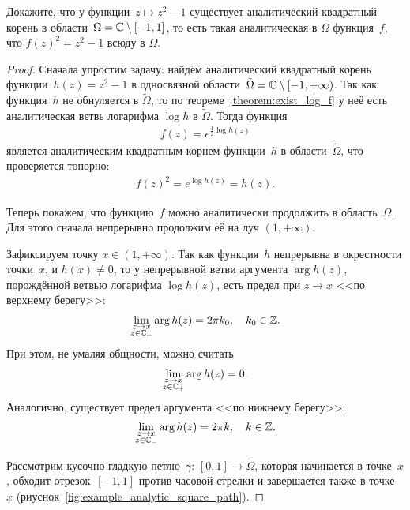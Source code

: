 \documentclass[../complex-analysis.tex]{subfiles}
\begin{document}
\begin{exmpl}
 Докажите, что у функции~$ z \mapsto z^{2}-1 $ существует аналитический квадратный корень в области~$ \Omega = \mathbb{C} \setminus [-1,1] $, то есть такая аналитическая в $ \Omega $ функция~$ f $, что $ f(z)^{2} = z^{2} - 1 $ всюду в $ \Omega $.
\end{exmpl}
\begin{proof}
 Сначала упростим задачу: найдём аналитический квадратный корень функции~$ h(z) = z^{2}-1 $ в односвязной области~$ \tilde\Omega = \mathbb{C} \setminus [-1, +\infty) $. Так как функция~$ h $ не обнуляется в $ \tilde\Omega $, то по теореме~\ref{theorem:exist_log_f} у неё есть аналитическая ветвь логарифма $ \log h $ в $ \tilde\Omega $. Тогда функция
 \begin{align*}
  f(z) = e^{\frac{1}{2}\log h(z)}
 \end{align*} является аналитическим квадратным корнем функции~$h$ в области~$ \tilde\Omega $, что проверяется топорно:
 \begin{align*}
  f(z)^{2} = e^{\log h(z)} = h(z).
 \end{align*}

 Теперь покажем, что функцию~$ f $ можно аналитически продолжить в область~$ \Omega $. Для этого сначала непрерывно продолжим её на луч $ (1,+\infty) $.

 Зафиксируем точку $ x \in (1,+\infty) $. Так как функция~$ h $ непрерывна в окрестности точки~$ x $, и $ h(x) \neq 0 $, то у непрерывной ветви аргумента $ \arg h(z) $, порождённой ветвью логарифма $ \log h(z) $, есть предел при $ z \to x $ <<по верхнему берегу>>:
 \begin{align*}
  \lim_{\substack{z \to x \\ z \in \mathbb{C}_+}} \arg h(z) = 2\pi k_0, \quad k_0\in\mathbb{Z}.
 \end{align*} При этом, не умаляя общности, можно считать
 \begin{align}
  \label{eq:Lim Upper Bank:Example Argument Principle}
  \lim_{\substack{z \to x \\ z \in \mathbb{C}_+}} \arg h(z) = 0.
 \end{align} Аналогично, существует предел аргумента <<по нижнему берегу>>:
 \begin{align}
  \label{eq:Lim Lower Bank:Example Argument Principle}
  \lim_{\substack{z \to x \\ z \in \mathbb{C}_-}} \arg h(z) = 2\pi k, \quad k \in \mathbb{Z}.
 \end{align}

 Рассмотрим кусочно-гладкую петлю~$ \gamma \colon\,[0,1] \to \tilde \Omega $, которая начинается в точке~$ x $, обходит отрезок~$ [-1,1] $ против часовой стрелки и завершается также в точке~$ x $ (риуснок~\ref{fig:example_analytic_square_path}).


\end{proof}
\end{document}
